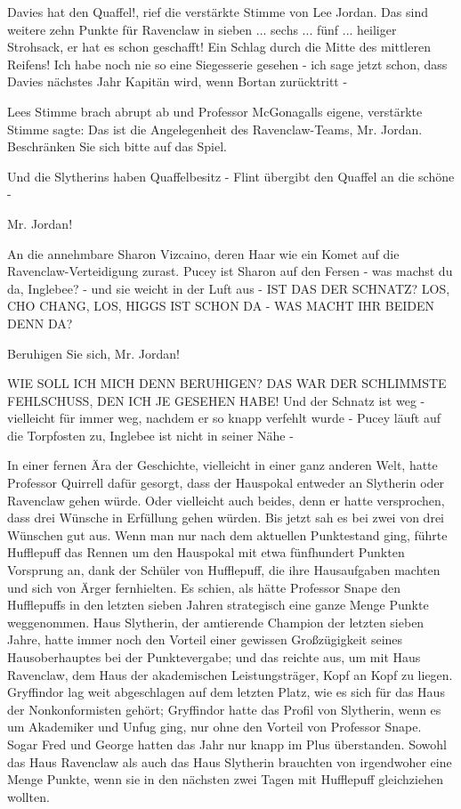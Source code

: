 \glqq{}Davies hat den Quaffel!\grqq{}, rief die verstärkte Stimme von Lee Jordan.
\glqq{}Das sind weitere zehn Punkte für Ravenclaw in sieben ... sechs ... fünf
... heiliger Strohsack, er hat es schon geschafft! Ein Schlag durch die Mitte
des mittleren Reifens! Ich habe noch nie so eine Siegesserie gesehen - ich sage
jetzt schon, dass Davies nächstes Jahr Kapitän wird, wenn Bortan zurücktritt -\grqq{}

Lees Stimme brach abrupt ab und Professor McGonagalls eigene, verstärkte Stimme
sagte: \glqq{}Das ist die Angelegenheit des Ravenclaw-Teams, Mr. Jordan.
Beschränken Sie sich bitte auf das Spiel.\grqq{}

\glqq{}Und die Slytherins haben Quaffelbesitz - Flint übergibt den Quaffel an die
schöne -\grqq{}

\glqq{}Mr. Jordan!\grqq{}

\glqq{}An die annehmbare Sharon Vizcaino, deren Haar wie ein Komet auf die
Ravenclaw-Verteidigung zurast. Pucey ist Sharon auf den Fersen - was machst du
da, Inglebee? - und sie weicht in der Luft aus - IST DAS DER SCHNATZ? LOS, CHO
CHANG, LOS, HIGGS IST SCHON DA - WAS MACHT IHR BEIDEN DENN DA?\grqq{}

\glqq{}Beruhigen Sie sich, Mr. Jordan!\grqq{}

\glqq{}WIE SOLL ICH MICH DENN BERUHIGEN? DAS WAR DER SCHLIMMSTE FEHLSCHUSS, DEN
ICH JE GESEHEN HABE! Und der Schnatz ist weg - vielleicht für immer weg, nachdem
er so knapp verfehlt wurde - Pucey läuft auf die Torpfosten zu, Inglebee ist
nicht in seiner Nähe -\grqq{}

In einer fernen Ära der Geschichte, vielleicht in einer ganz anderen Welt, hatte
Professor Quirrell dafür gesorgt, dass der Hauspokal entweder an Slytherin oder
Ravenclaw gehen würde. Oder vielleicht auch beides, denn er hatte versprochen,
dass drei Wünsche in Erfüllung gehen würden. Bis jetzt sah es bei zwei von drei
Wünschen gut aus. Wenn man nur nach dem aktuellen Punktestand ging, führte
Hufflepuff das Rennen um den Hauspokal mit etwa fünfhundert Punkten Vorsprung
an, dank der Schüler von Hufflepuff, die ihre Hausaufgaben machten und sich von
Ärger fernhielten. Es schien, als hätte Professor Snape den Hufflepuffs in den
letzten sieben Jahren strategisch eine ganze Menge Punkte weggenommen. Haus
Slytherin, der amtierende Champion der letzten sieben Jahre, hatte immer noch
den Vorteil einer gewissen Großzügigkeit seines Hausoberhauptes bei der
Punktevergabe; und das reichte aus, um mit Haus Ravenclaw, dem Haus der
akademischen Leistungsträger, Kopf an Kopf zu liegen. Gryffindor lag weit
abgeschlagen auf dem letzten Platz, wie es sich für das Haus der Nonkonformisten
gehört; Gryffindor hatte das Profil von Slytherin, wenn es um Akademiker und
Unfug ging, nur ohne den Vorteil von Professor Snape. Sogar Fred und George
hatten das Jahr nur knapp im Plus überstanden. Sowohl das Haus Ravenclaw als
auch das Haus Slytherin brauchten von irgendwoher eine Menge Punkte, wenn sie in
den nächsten zwei Tagen mit Hufflepuff gleichziehen wollten.

